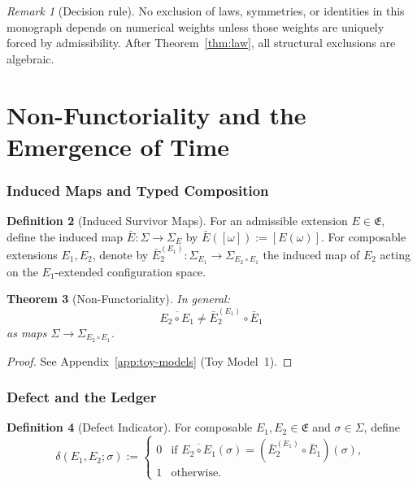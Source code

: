 \documentclass[11pt,a4paper]{article}
\newtheorem{theorem}{Theorem}[section]
\theoremstyle{definition}
\newtheorem{definition}[theorem]{Definition}
\theoremstyle{remark}
\newtheorem{remark}[theorem]{Remark}
\begin{document}
\begin{remark}[Decision rule]\label{rem:decision}
No exclusion of laws, symmetries, or identities in this monograph depends on numerical weights unless those weights are uniquely forced by admissibility. After Theorem~\ref{thm:law}, all structural exclusions are algebraic.
\end{remark}


\part{Non-Functoriality and the Emergence of Time}

\section{Induced Maps and Typed Composition}

\begin{definition}[Induced Survivor Maps]\label{def:induced}
For an admissible extension $E \in \mathfrak{E}$, define the induced map $\bar{E} \colon \Sigma \to \Sigma_E$ by $\bar{E}([\omega]) := [E(\omega)]$. For composable extensions $E_1, E_2$, denote by $\bar{E}_2^{(E_1)} \colon \Sigma_{E_1} \to \Sigma_{E_2 \circ E_1}$ the induced map of $E_2$ acting on the $E_1$-extended configuration space.
\end{definition}

\begin{theorem}[Non-Functoriality]\label{thm:nonfunc}
In general:
\[
  \overline{E_2 \circ E_1} \neq \bar{E}_2^{(E_1)} \circ \bar{E}_1
\]
as maps $\Sigma \to \Sigma_{E_2 \circ E_1}$.
\end{theorem}
\begin{proof}
See Appendix~\ref{app:toy-models} (Toy Model~1).
\end{proof}

\section{Defect and the Ledger}

\begin{definition}[Defect Indicator]\label{def:defect}
For composable $E_1, E_2 \in \mathfrak{E}$ and $\sigma \in \Sigma$, define
\[
  \delta(E_1, E_2; \sigma) :=
  \begin{cases}
    0 & \text{if } \overline{E_2 \circ E_1}(\sigma) = (\bar{E}_2^{(E_1)} \circ \bar{E}_1)(\sigma), \\
    1 & \text{otherwise.}
  \end{cases}
\]
\end{definition}
\end{document}
